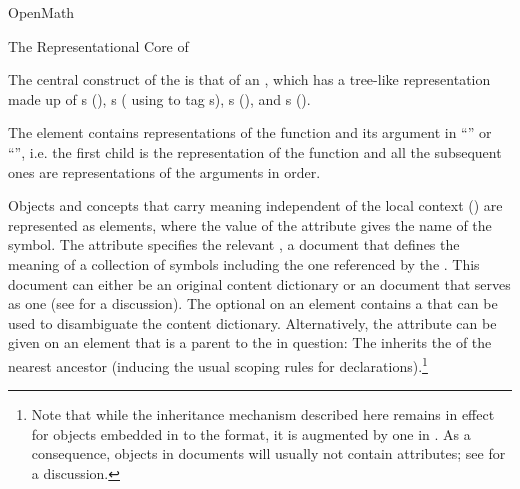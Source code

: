 \begin{omgroup}[id=mobj,short=Mathematical Objects]
\begin{omgroup}[id=openmath]{OpenMath}
\begin{module}[id=OpenMath]
\begin{omgroup}[id=om.core]{The Representational Core of {\openmath}}

\begin{definition}[id=omcore.def]
  The central construct of the {\openmath} is that of an {}, which has a tree-like representation made up of
  {s} ({}), {s}
  ({} using {} to tag
  {s}), {s} ({}), and
  {s} ({}).
\end{definition}

The {} element contains representations of the function and its
argument in ``'' or ``{}'',
i.e. the first child is the representation of the function and all the subsequent ones are
representations of the arguments in order.

\begin{omtext}
Objects and concepts that carry meaning independent of the local context () are represented as
{} elements, where the value of the
{} attribute gives the name of the symbol.  The
{} attribute specifies the relevant {}, a document that defines the meaning of a collection of symbols including
the one referenced by the {}.  This document can either be an
original {\openmath} content dictionary or an {\omdoc} document that serves as one (see
{} for a discussion). The optional {} on
an {} element contains a {} that can be used to
disambiguate the content dictionary.  Alternatively, the {}
attribute can be given on an {\openmath} element that is a parent to the
{} in question: The {} inherits the
{} of the nearest ancestor (inducing the usual {\xml} scoping rules
for declarations).\footnote{Note that while the {} inheritance
  mechanism described here remains in effect for {\openmath} objects embedded in to the
  {\omdoc} format, it is augmented by one in {\omdoc}. As a consequence, {\openmath}
  objects in {\omdoc} documents will usually not contain {}
  attributes; see {} for a discussion.}
\end{omtext}


\end{omgroup}
\end{module}
\end{omgroup}
\end{omgroup}
